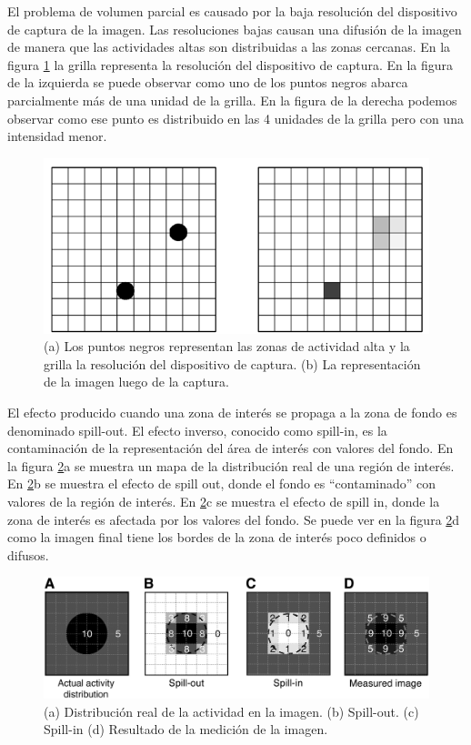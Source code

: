 El problema de volumen parcial es causado por la baja resolución del dispositivo de captura de la imagen. Las resoluciones bajas causan una difusión de la imagen de manera que las actividades altas son distribuidas a las zonas cercanas. En la figura \ref{fig:resolucion} la grilla representa la resolución del dispositivo de captura. En la figura de la izquierda se puede observar como uno de los puntos negros abarca parcialmente más de una unidad de la grilla. En la figura de la derecha podemos observar como ese punto es distribuido en las 4 unidades de la grilla pero con una intensidad menor.

\begin{figure}[H]
\centering
\includegraphics[scale=0.3]{images/resolution.png}
\caption{(a) Los puntos negros representan las zonas de actividad alta y la grilla la resolución del dispositivo de captura. (b) La representación de la imagen luego de la captura.}
\label{fig:resolucion}
\end{figure}

El efecto producido cuando una zona de interés se propaga a la zona de fondo es denominado spill-out. El efecto inverso, conocido como spill-in, es la contaminación de la representación del área de interés con valores del fondo. En la figura \ref{fig:spill}a se muestra un mapa de la distribución real de una región de interés. En \ref{fig:spill}b se muestra el efecto de spill out, donde el fondo es “contaminado” con valores de la región de interés. En \ref{fig:spill}c se muestra el efecto de spill in, donde la zona de interés es afectada por los valores del fondo. Se puede ver en la figura \ref{fig:spill}d como la imagen final tiene los bordes de la zona de interés poco definidos o difusos.

\begin{figure}[H]
\centering
\includegraphics[scale=0.2]{images/spill.jpg}
\caption{(a) Distribución real de la actividad en la imagen. (b) Spill-out. (c) Spill-in (d) Resultado de la medición de la imagen.}
\label{fig:spill}
\end{figure}

